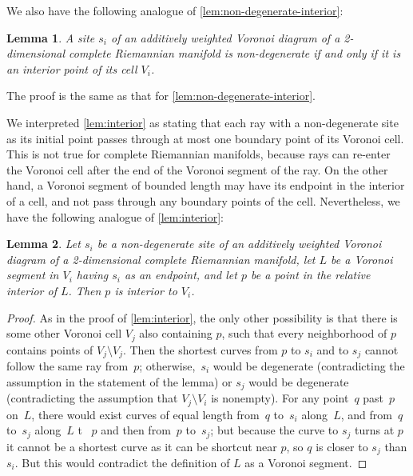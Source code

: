 \documentclass[11pt]{article}
\newtheorem{lemma}{Lemma}
\theoremstyle{definition}
\begin{document}
We also have the following analogue of \cref{lem:non-degenerate-interior}:

\begin{lemma}
\label{lem:Riemann-ndgi}
A site $s_i$ of an additively weighted Voronoi diagram of a 2-dimensional complete Riemannian manifold is non-degenerate if and only if it is an interior point of its cell $V_i$.
\end{lemma}

The proof is the same as that for \cref{lem:non-degenerate-interior}.

We interpreted \cref{lem:interior} as stating that each ray with a non-degenerate site as its initial point passes through at most one boundary point of its Voronoi cell. This is not true for complete Riemannian manifolds, because rays can re-enter the Voronoi cell after the end of the Voronoi segment of the ray. On the other hand, a Voronoi segment of bounded length may have its endpoint in the interior of a cell, and not pass through any boundary points of the cell. Nevertheless, we have the following analogue of \cref{lem:interior}:

\begin{lemma}
\label{lem:Riemann-interior}
Let $s_i$ be a non-degenerate site of an additively weighted Voronoi diagram of a 2-dimensional complete Riemannian manifold, let $L$ be a Voronoi segment in $V_i$ having $s_i$ as an endpoint, and let $p$ be a point in the relative interior of $L$. Then $p$ is interior to $V_i$.
\end{lemma}

\begin{proof}
As in the proof of \cref{lem:interior}, the only other possibility is that there is some other Voronoi cell $V_j$ also containing $p$, such that every neighborhood of $p$ contains points of $V_j\setminus V_j$. Then the shortest curves from $p$ to $s_i$ and to $s_j$ cannot follow the same ray from~$p$; otherwise,~$s_i$ would be degenerate (contradicting the assumption in the statement of the lemma) or $s_j$ would be degenerate (contradicting the assumption that $V_j\setminus V_i$ is nonempty). For any point~$q$ past~$p$ on~$L$, there would exist curves of equal length from~$q$ to~$s_i$ along~$L$, and from~$q$ to~$s_j$ along~$L$ t~ $p$ and then from~$p$ to~$s_j$; but because the curve to $s_j$ turns at $p$ it cannot be a shortest curve as it can be shortcut near $p$, so $q$ is closer to $s_j$ than $s_i$. But this would contradict the definition of $L$ as a Voronoi segment.
\end{proof}
\fi
\end{document}

